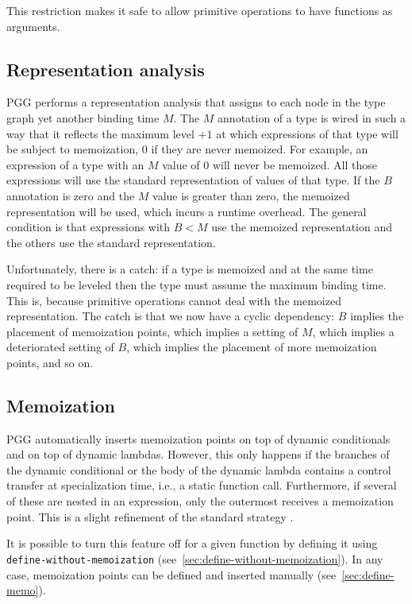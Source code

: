 \documentclass[11pt]{article}
\begin{document}
This restriction makes it safe to allow primitive operations to have
functions as arguments. 

\subsection{Representation analysis}
\label{sec:representation-analysis}

PGG performs a representation analysis that assigns to each node in
the type graph yet another binding time $M$. The $M$ annotation of a
type is wired in such a way that it reflects the maximum level $+1$ at which
expressions of that type will be subject to memoization, $0$ if they
are never memoized. For example,
an expression of a type with an $M$ value of $0$ will never be 
memoized. All those expressions will use the standard representation
of values of that type. If the $B$ annotation is zero and the $M$
value is greater than zero, the memoized representation will be used,
which incurs a runtime overhead. The general condition is that
expressions with $B<M$ use the memoized representation and the others
use the standard representation.

Unfortunately, there is a catch: if a type is memoized and at the same
time required to be leveled then the type must assume the maximum
binding time. This is, because primitive operations cannot deal with
the memoized representation. The catch is that we now have a cyclic
dependency: $B$ implies the placement of memoization points, which
implies a setting of $M$, which implies a deteriorated setting of $B$,
which implies the placement of more memoization points, and so on.

\subsection{Memoization}
\label{sec:memoization}

%
PGG automatically inserts memoization points on top of dynamic
conditionals and on top of dynamic lambdas. However, this only happens
if the branches of the dynamic conditional or the body of the dynamic
lambda contains a control transfer at specialization time, i.e., a
static function call. Furthermore, if several of these are nested in
an expression, only the outermost receives a memoization point. This
is a slight refinement of the standard strategy
\cite{BondorfDanvy1991,Bondorf1991}. 

It is possible to turn this feature off for a given function by
defining it using \texttt{define-without-memoization}
(see~\ref{sec:define-without-memoization}). In any case, 
memoization points can be defined and inserted manually
(see~\ref{sec:define-memo}). 
\end{document}
